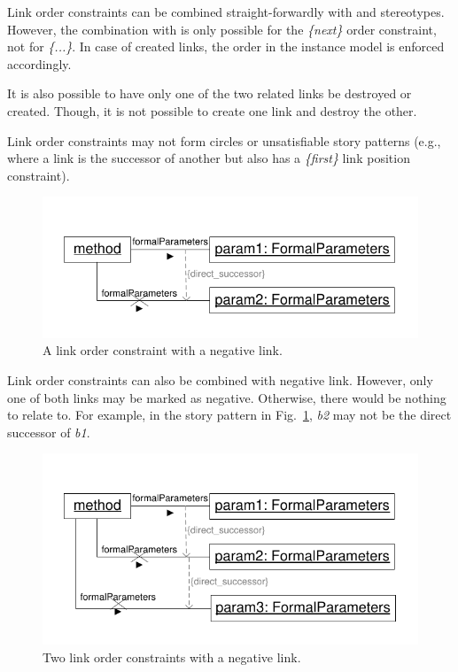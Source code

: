 {



Link order constraints can be combined straight-forwardly with \create and \destroy stereotypes. However, the combination with \create is only possible for the \emph{\{next\}} order constraint, not for \emph{\{...\}}. In case of created links, the order in the instance model is enforced accordingly.



It is also possible to have only one of the two related links be destroyed or created. Though, it is not possible to create one link and destroy the other.

Link order constraints may not form circles or unsatisfiable story patterns (e.g., where a link is the successor of another but also has a \emph{\{first\}} link position constraint).

\begin{figure}[htbp]
\center
\includegraphics[width=0.75\columnwidth]{figures/LinkOrderConstraintDirectSuccessorNegative}
\caption{A link order constraint with a negative link.}
\label{fig:linkOrderConstraints:linkOrderConstaint2}
\end{figure}

Link order constraints can also be combined with negative link. However, only one of both links may be marked as negative. Otherwise, there would be nothing to relate to. For example, in the story pattern in Fig.~\ref{fig:linkOrderConstraints:linkOrderConstaint2}, \emph{b2} may not be the direct successor of \emph{b1}.

\begin{figure}[htbp]
\center
\includegraphics[width=0.75\columnwidth]{figures/LinkOrderConstraintDirectSuccessorNegative2}
\caption{Two link order constraints with a negative link.}
\label{fig:linkOrderConstraints:linkOrderConstaint3}
\end{figure}

}
